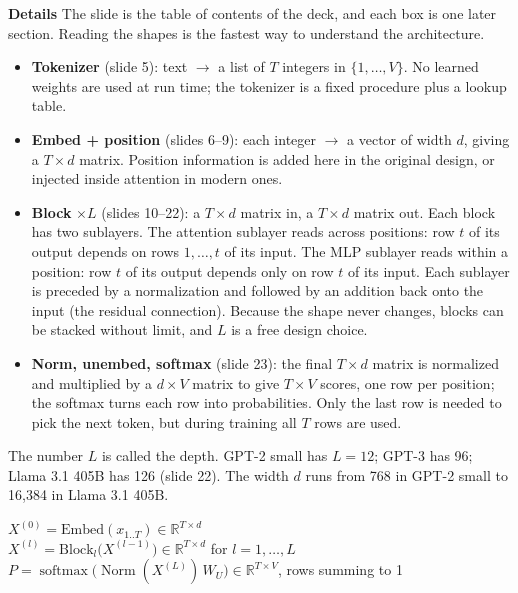 \documentclass[11pt,letterpaper]{article}
\newcommand{\para}[1]{\medskip\noindent\textbf{#1}\quad}
\newenvironment{formulas}{\begin{tcolorbox}[formulabox]}{\end{tcolorbox}}
\DeclareMathOperator{\softmax}{softmax}
\DeclareMathOperator{\Norm}{Norm}
\begin{document}
\para{Details} The slide is the table of contents of the deck, and each box is one later section. Reading the shapes is the fastest way to understand the architecture.
\begin{itemize}
\item \textbf{Tokenizer} (slide 5): text $\to$ a list of $T$ integers in $\{1,\dots,V\}$. No learned weights are used at run time; the tokenizer is a fixed procedure plus a lookup table.
\item \textbf{Embed + position} (slides 6--9): each integer $\to$ a vector of width $d$, giving a $T\times d$ matrix. Position information is added here in the original design, or injected inside attention in modern ones.
\item \textbf{Block} $\times L$ (slides 10--22): a $T\times d$ matrix in, a $T\times d$ matrix out. Each block has two sublayers. The attention sublayer reads across positions: row $t$ of its output depends on rows $1,\dots,t$ of its input. The MLP sublayer reads within a position: row $t$ of its output depends only on row $t$ of its input. Each sublayer is preceded by a normalization and followed by an addition back onto the input (the residual connection). Because the shape never changes, blocks can be stacked without limit, and $L$ is a free design choice.
\item \textbf{Norm, unembed, softmax} (slide 23): the final $T\times d$ matrix is normalized and multiplied by a $d\times V$ matrix to give $T\times V$ scores, one row per position; the softmax turns each row into probabilities. Only the last row is needed to pick the next token, but during training all $T$ rows are used.
\end{itemize}
The number $L$ is called the depth. GPT-2 small has $L=12$; GPT-3 has 96; Llama 3.1 405B has 126 (slide 22). The width $d$ runs from 768 in GPT-2 small to 16,384 in Llama 3.1 405B.

\begin{formulas}
$X^{(0)}=\mathrm{Embed}(x_{1..T})\in\mathbb{R}^{T\times d}$ \\[3pt]
$X^{(l)}=\mathrm{Block}_l\big(X^{(l-1)}\big)\in\mathbb{R}^{T\times d}$ for $l=1,\dots,L$ \\[3pt]
$P=\softmax\big(\Norm(X^{(L)})\,W_U\big)\in\mathbb{R}^{T\times V}$, rows summing to 1
\end{formulas}
\end{document}

